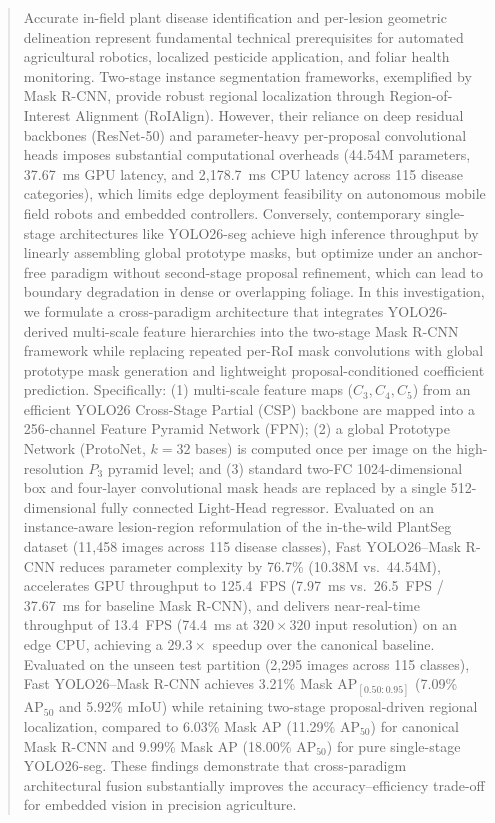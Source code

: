 \documentclass[5p,times]{elsarticle}
\begin{document}
\begin{frontmatter}
\begin{abstract}
Accurate in-field plant disease identification and per-lesion geometric delineation represent fundamental technical prerequisites for automated agricultural robotics, localized pesticide application, and foliar health monitoring. Two-stage instance segmentation frameworks, exemplified by Mask R-CNN, provide robust regional localization through Region-of-Interest Alignment (RoIAlign). However, their reliance on deep residual backbones (ResNet-50) and parameter-heavy per-proposal convolutional heads imposes substantial computational overheads (44.54M parameters, 37.67~ms GPU latency, and 2,178.7~ms CPU latency across 115 disease categories), which limits edge deployment feasibility on autonomous mobile field robots and embedded controllers. Conversely, contemporary single-stage architectures like YOLO26-seg achieve high inference throughput by linearly assembling global prototype masks, but optimize under an anchor-free paradigm without second-stage proposal refinement, which can lead to boundary degradation in dense or overlapping foliage. In this investigation, we formulate a cross-paradigm architecture that integrates YOLO26-derived multi-scale feature hierarchies into the two-stage Mask R-CNN framework while replacing repeated per-RoI mask convolutions with global prototype mask generation and lightweight proposal-conditioned coefficient prediction. Specifically: (1) multi-scale feature maps ($C_3, C_4, C_5$) from an efficient YOLO26 Cross-Stage Partial (CSP) backbone are mapped into a 256-channel Feature Pyramid Network (FPN); (2) a global Prototype Network (ProtoNet, $k=32$ bases) is computed once per image on the high-resolution $P_3$ pyramid level; and (3) standard two-FC 1024-dimensional box and four-layer convolutional mask heads are replaced by a single 512-dimensional fully connected Light-Head regressor. Evaluated on an instance-aware lesion-region reformulation of the in-the-wild PlantSeg dataset (11,458 images across 115 disease classes), Fast YOLO26--Mask R-CNN reduces parameter complexity by 76.7\% (10.38M vs.\ 44.54M), accelerates GPU throughput to 125.4~FPS (7.97~ms vs.\ 26.5~FPS / 37.67~ms for baseline Mask R-CNN), and delivers near-real-time throughput of 13.4~FPS (74.4~ms at $320 \times 320$ input resolution) on an edge CPU, achieving a $29.3\times$ speedup over the canonical baseline. Evaluated on the unseen test partition (2,295 images across 115 classes), Fast YOLO26--Mask R-CNN achieves 3.21\% Mask $\mathrm{AP}_{[0.50:0.95]}$ (7.09\% $\mathrm{AP}_{50}$ and 5.92\% mIoU) while retaining two-stage proposal-driven regional localization, compared to 6.03\% Mask $\mathrm{AP}$ (11.29\% $\mathrm{AP}_{50}$) for canonical Mask R-CNN and 9.99\% Mask $\mathrm{AP}$ (18.00\% $\mathrm{AP}_{50}$) for pure single-stage YOLO26-seg. These findings demonstrate that cross-paradigm architectural fusion substantially improves the accuracy--efficiency trade-off for embedded vision in precision agriculture.
\end{abstract}


\end{frontmatter}
\end{document}
